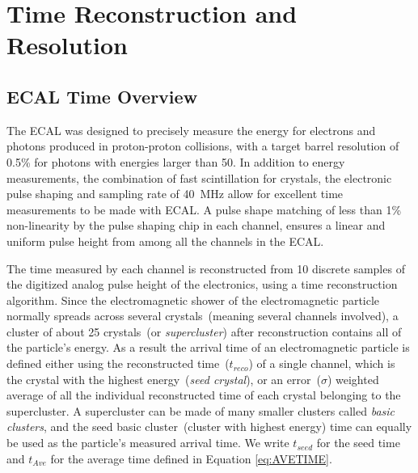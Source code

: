 \chapter{Time Reconstruction and Resolution}
\section*{ECAL Time Overview}
The ECAL was designed to precisely measure the energy for electrons and photons produced in proton-proton collisions, with a target barrel resolution of 0.5\% for photons with energies larger than 50\GeV. In addition to energy measurements, the combination of fast scintillation for \pb crystals, the electronic pulse shaping and sampling rate of 40~MHz allow for excellent time measurements to be made with ECAL. A pulse shape matching of less than 1\% non-linearity by the pulse shaping chip in each channel, ensures a linear and uniform pulse height from among all the channels in the ECAL. 
\par  
The time measured by each channel is reconstructed from 10 discrete samples of the digitized analog pulse height of the electronics, using a time reconstruction algorithm. 
\newline 
Since the electromagnetic shower of the electromagnetic particle normally spreads across several crystals~(meaning several channels involved), a cluster of about 25 crystals~(or \textit{supercluster}) after reconstruction contains all of the particle's energy. As a result the arrival time of an electromagnetic particle is defined either using the reconstructed time~($ t_{reco}$) of a single channel, which is the crystal with the highest energy~(\textit{seed crystal}), or an error~($\sigma$) weighted average of all the individual reconstructed time of each crystal belonging to the supercluster. A supercluster can be made of many smaller clusters called \textit{basic clusters}, and the seed basic cluster~(cluster with highest energy) time can equally be used as the particle's measured arrival time. We write $t_{seed}$ for the seed time and $t_{Ave}$ for the average time defined in Equation \ref{eq:AVETIME}.



